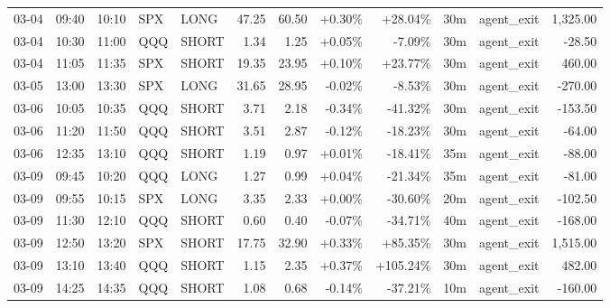 \documentclass[11pt,a4paper,twoside]{article}
\begin{document}
\begin{center}
\begin{longtable}{>{\color{txtmain}}l l l l l r r r r r >{\color{txtmain}}l r}
03-04 & 09:40 & 10:10 & SPX & LONG & 47.25 & 60.50 & \textcolor{wingreen}{+0.30\%} & \textcolor{wingreen}{+28.04\%} & 30m & agent\_exit & \textcolor{wingreen}{1,325.00} \\
03-04 & 10:30 & 11:00 & QQQ & SHORT & 1.34 & 1.25 & \textcolor{wingreen}{+0.05\%} & \textcolor{lossred}{-7.09\%} & 30m & agent\_exit & \textcolor{lossred}{-28.50} \\
03-04 & 11:05 & 11:35 & SPX & SHORT & 19.35 & 23.95 & \textcolor{wingreen}{+0.10\%} & \textcolor{wingreen}{+23.77\%} & 30m & agent\_exit & \textcolor{wingreen}{460.00} \\
03-05 & 13:00 & 13:30 & SPX & LONG & 31.65 & 28.95 & \textcolor{lossred}{-0.02\%} & \textcolor{lossred}{-8.53\%} & 30m & agent\_exit & \textcolor{lossred}{-270.00} \\
03-06 & 10:05 & 10:35 & QQQ & SHORT & 3.71 & 2.18 & \textcolor{lossred}{-0.34\%} & \textcolor{lossred}{-41.32\%} & 30m & agent\_exit & \textcolor{lossred}{-153.50} \\
03-06 & 11:20 & 11:50 & QQQ & SHORT & 3.51 & 2.87 & \textcolor{lossred}{-0.12\%} & \textcolor{lossred}{-18.23\%} & 30m & agent\_exit & \textcolor{lossred}{-64.00} \\
03-06 & 12:35 & 13:10 & QQQ & SHORT & 1.19 & 0.97 & \textcolor{wingreen}{+0.01\%} & \textcolor{lossred}{-18.41\%} & 35m & agent\_exit & \textcolor{lossred}{-88.00} \\
03-09 & 09:45 & 10:20 & QQQ & LONG & 1.27 & 0.99 & \textcolor{wingreen}{+0.04\%} & \textcolor{lossred}{-21.34\%} & 35m & agent\_exit & \textcolor{lossred}{-81.00} \\
03-09 & 09:55 & 10:15 & SPX & LONG & 3.35 & 2.33 & \textcolor{wingreen}{+0.00\%} & \textcolor{lossred}{-30.60\%} & 20m & agent\_exit & \textcolor{lossred}{-102.50} \\
03-09 & 11:30 & 12:10 & QQQ & SHORT & 0.60 & 0.40 & \textcolor{lossred}{-0.07\%} & \textcolor{lossred}{-34.71\%} & 40m & agent\_exit & \textcolor{lossred}{-168.00} \\
03-09 & 12:50 & 13:20 & SPX & SHORT & 17.75 & 32.90 & \textcolor{wingreen}{+0.33\%} & \textcolor{wingreen}{+85.35\%} & 30m & agent\_exit & \textcolor{wingreen}{1,515.00} \\
03-09 & 13:10 & 13:40 & QQQ & SHORT & 1.15 & 2.35 & \textcolor{wingreen}{+0.37\%} & \textcolor{wingreen}{+105.24\%} & 30m & agent\_exit & \textcolor{wingreen}{482.00} \\
03-09 & 14:25 & 14:35 & QQQ & SHORT & 1.08 & 0.68 & \textcolor{lossred}{-0.14\%} & \textcolor{lossred}{-37.21\%} & 10m & agent\_exit & \textcolor{lossred}{-160.00} \\

\end{longtable}
\end{center}
\end{document}
